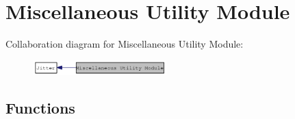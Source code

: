 \hypertarget{group__utilitymod}{
\section{Miscellaneous Utility Module}
\label{group__utilitymod}
}


Collaboration diagram for Miscellaneous Utility Module:\nopagebreak
\begin{figure}[H]
\begin{center}
\leavevmode
\includegraphics[width=146pt]{group__utilitymod}
\end{center}
\end{figure}
\subsection*{Functions}
